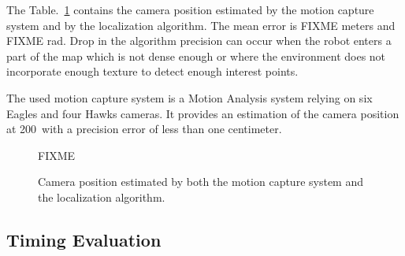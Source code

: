The Table.~\ref{tab:mocap_comparison} contains the camera position
estimated by the motion capture system and by the localization
algorithm. The mean error is FIXME meters and FIXME rad. Drop in the
algorithm precision can occur when the robot enters a part of the map
which is not dense enough or where the environment does not
incorporate enough texture to detect enough interest points.


The used motion capture system is a Motion Analysis system relying on
six Eagles and four Hawks cameras. It provides an estimation of the
camera position at 200\hertz~with a precision error of less than one
centimeter.


\begin{figure}[ht!]
  \begin{center}
    FIXME
  \end{center}
  \caption{Camera position estimated by both the motion capture system
    and the localization algorithm. \label{tab:mocap_comparison}}
\end{figure}

\subsection{Timing Evaluation}\label{sec:timing}

